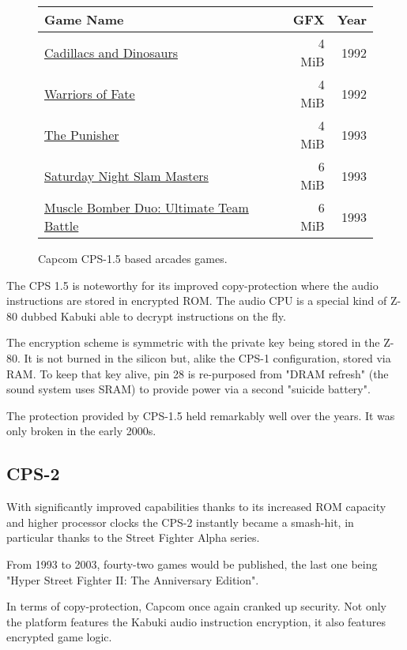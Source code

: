 \begin{figure}[H]
{ \setlength{\tabcolsep}{3.0pt}
\begin{tabularx}{\textwidth}{Xrr}
  \toprule    
  \textbf{Game Name} & \textbf{ GFX }  & \textbf{ Year } \\               
  \toprule    
\href{}{Cadillacs and Dinosaurs} & 4 MiB & 1992 \\ 
\href{}{Warriors of Fate} & 4 MiB & 1992 \\ 
\href{}{The Punisher} & 4 MiB & 1993 \\ 
\href{}{Saturday Night Slam Masters} & 6 MiB & 1993 \\ 
\href{}{Muscle Bomber Duo: Ultimate Team Battle} & 6 MiB & 1993 \\ 
  \toprule    
\end{tabularx}%
}\caption*{Capcom CPS-1.5 based arcades games.}
\end{figure}

The CPS 1.5 is noteworthy for its improved copy-protection where the audio instructions are stored in encrypted ROM. The audio CPU is a special kind of Z-80 dubbed Kabuki\cite{arcadeHackerKabuki} able to decrypt instructions on the fly.

The encryption scheme is symmetric with the private key being stored in the Z-80. It is not burned in the silicon but, alike the CPS-1 configuration, stored via RAM. To keep that key alive, pin 28 is re-purposed from "DRAM refresh" (the sound system uses SRAM) to provide power via a second "suicide battery". 

\begin{trivia}
The protection provided by CPS-1.5 held remarkably well over the years. It was only broken in the early 2000s\cite{ame_kabuki}.
\end{trivia}

\subsection{CPS-2}

With significantly improved capabilities thanks to its increased ROM capacity and higher processor clocks the CPS-2 instantly became a smash-hit, in particular thanks to the Street Fighter Alpha series. 

From 1993 to 2003, fourty-two games would be published, the last one being "Hyper Street Fighter II: The Anniversary Edition".

In terms of copy-protection, Capcom once again cranked up security. Not only the platform features the Kabuki audio instruction encryption, it also features encrypted game logic. 

